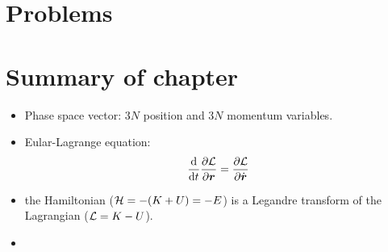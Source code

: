\section{Problems}


\section*{Summary of chapter}

\begin{itemize}
	\item Phase space vector: $3N$ position and $3N$ momentum variables.
	\item Eular-Lagrange equation: \[ \dfrac{\mathrm{d} }{\mathrm{d} t}\dfrac{\partial \mathcal{L}}{\partial \boldsymbol{r}}=\dfrac{\partial \mathcal{L}}{\partial \dot{\boldsymbol{r}}} \]
	\item the Hamiltonian ($\mathcal{H}=-(K+U)=-E$) is a Legandre transform of the Lagrangian ($\mathcal{L}=K-U$).
	\item 
\end{itemize}